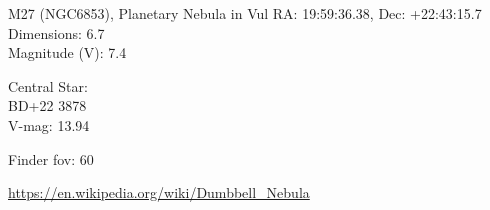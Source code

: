\begin{block}{M27 (NGC6853), Planetary Nebula in Vul}
    RA: 19:59:36.38, Dec: +22:43:15.7 \\ 
    Dimensions: 6.7 \\ 
    Magnitude (V): 7.4

    Central Star: \\ 
      \hspace{1em}BD+22 3878 \\ 
      \hspace{1em}V-mag: 13.94 


    Finder fov: 60 

    \url{https://en.wikipedia.org/wiki/Dumbbell_Nebula} 
\end{block}